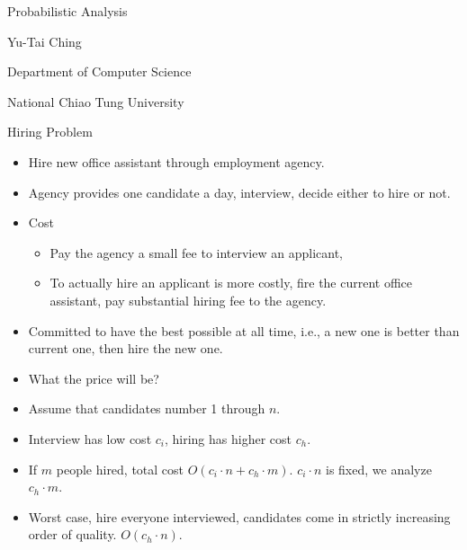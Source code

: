 \documentclass{beamer}
\begin{document}
\begin{frame}{}

\vspace{1in}
\centerline{\Large Probabilistic Analysis}
\vspace{0.5cm}
\centerline{Yu-Tai Ching}
\centerline{Department of Computer Science}
\centerline{National Chiao Tung University} 
\end{frame}

\begin{frame}{Hiring Problem}

\begin{itemize}
\item Hire new office assistant through employment agency.
\item Agency provides one candidate a day, interview, decide either to hire or not. 
\item Cost
\begin{itemize}
\item Pay the agency a small fee to interview an applicant,
\item To actually hire an applicant is more costly, fire the current office assistant, pay substantial hiring fee to the agency.
\end{itemize}
\item Committed to have the best possible at all time, i.e., a new one is better than current one, then hire the new one.
\end{itemize}
\end{frame}

\begin{frame}{}

\begin{itemize}
\item What the price will be? 
\item Assume that candidates number 1 through $n$. 
\item Interview has low cost $c_i$, hiring has higher cost $c_h$.
\item If $m$ people hired, total cost $O(c_i\cdot n+c_h\cdot m)$. $c_i\cdot n$ is fixed, we analyze $c_h\cdot m$. 
\item Worst case, hire everyone interviewed, candidates come in strictly increasing order of quality. $O(c_h\cdot n)$. 
\end{itemize}
\end{frame}
\end{document}

